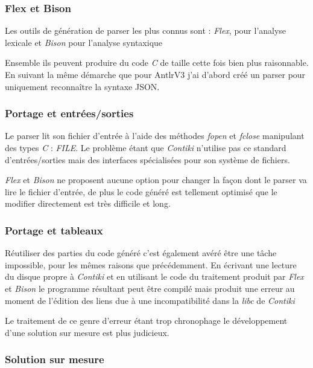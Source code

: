 \subsubsection{Flex et Bison}

Les outils de génération de parser les plus connus sont : \emph{Flex}\cite{flex}, pour l'analyse lexicale et \emph{Bison}\cite{bison} pour l'analyse syntaxique

Ensemble ils peuvent produire du code \emph{C} de taille cette fois bien plus raisonnable. En suivant la même démarche que pour AntlrV3 j'ai d'abord créé un parser pour uniquement reconnaître la syntaxe JSON.

\subsubsection{Portage et entrées/sorties}

Le parser lit son fichier d'entrée à l'aide des méthodes \emph{fopen} et \emph{fclose} manipulant des types \emph{C} : \emph{FILE}. Le problème étant que \emph{Contiki} n'utilise pas ce standard d'entrées/sorties mais des interfaces spécialisées pour son système de fichiers.

\emph{Flex} et \emph{Bison} ne proposent aucune option pour changer la façon dont le parser va lire le fichier d'entrée, de plus le code généré est tellement optimisé que le modifier directement est très difficile et long.

\subsubsection{Portage et tableaux}

Réutiliser des parties du code généré c'est également avéré être une tâche impossible, pour les mêmes raisons que précédemment. En écrivant une lecture du disque propre à \emph{Contiki} et en utilisant le code du traitement produit par \emph{Flex} et \emph{Bison} le programme résultant peut être compilé mais produit une erreur au moment de l'édition des liens due à une incompatibilité dans la \emph{libc} de \emph{Contiki}

Le traitement de ce genre d'erreur étant trop chronophage le développement d'une solution sur mesure est plus judicieux.

\subsubsection{Solution sur mesure}


